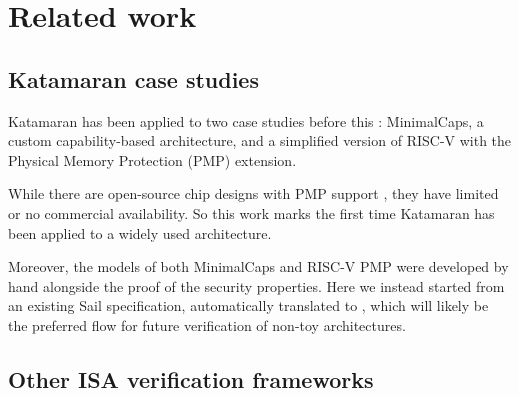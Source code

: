 \chapter{Related work}

\section{Katamaran case studies}

Katamaran has been applied to two case studies before this \cite{Huyghebaert2023}: MinimalCaps, a custom capability-based architecture, and a simplified version of RISC-V with the Physical Memory Protection (PMP) extension.

While there are open-source chip designs with PMP support \cite{ChipsAlliance}, they have limited or no commercial availability. So this work marks the first time Katamaran has been applied to a widely used architecture.

Moreover, the \usail models of both MinimalCaps and RISC-V PMP were developed by hand alongside the proof of the security properties. Here we instead started from an existing Sail specification, automatically translated to \usail, which will likely be the preferred flow for future verification of non-toy architectures.

\section{Other ISA verification frameworks}

